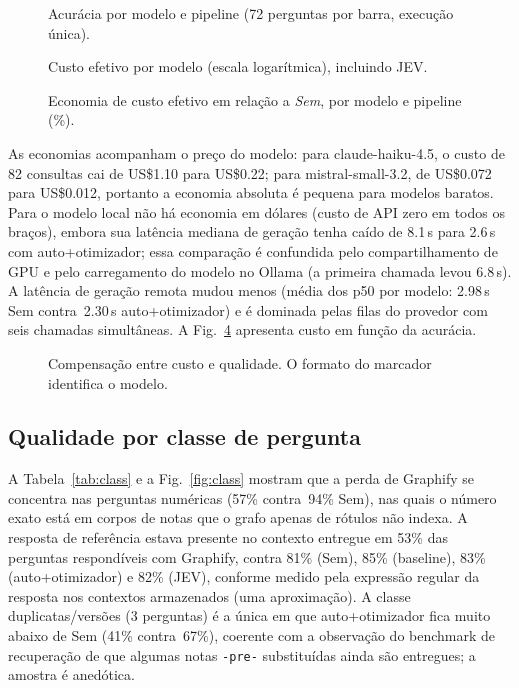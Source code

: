 \documentclass[conference,onecolumn,11pt]{IEEEtran}
\begin{document}
\begin{figure}[!htbp]\centering
{}
\caption{Acurácia por modelo e pipeline (72 perguntas por barra, execução única).}\label{fig:accmodel}
\end{figure}

\begin{figure}[!htbp]\centering
{}
\caption{Custo efetivo por modelo (escala logarítmica), incluindo JEV.}\label{fig:costmodel}
\end{figure}

\begin{figure}[!htbp]\centering
{}
\caption{Economia de custo efetivo em relação a \emph{Sem}, por modelo e pipeline (\%).}\label{fig:heat}
\end{figure}

As economias acompanham o preço do modelo: para claude-haiku-4.5, o custo de 82 consultas cai de US\$1.10 para US\$0.22; para mistral-small-3.2, de US\$0.072 para US\$0.012, portanto a economia absoluta é pequena para modelos baratos. Para o modelo local não há economia em dólares (custo de API zero em todos os braços), embora sua latência mediana de geração tenha caído de 8.1\,s para 2.6\,s com auto+otimizador; essa comparação é confundida pelo compartilhamento de GPU e pelo carregamento do modelo no Ollama (a primeira chamada levou 6.8\,s). A latência de geração remota mudou menos (média dos p50 por modelo: 2.98\,s Sem contra\ 2.30\,s auto+otimizador) e é dominada pelas filas do provedor com seis chamadas simultâneas. A Fig.~\ref{fig:pareto} apresenta custo em função da acurácia.

\begin{figure}[!htbp]\centering
{}
\caption{Compensação entre custo e qualidade. O formato do marcador identifica o modelo.}\label{fig:pareto}
\end{figure}

\subsection{Qualidade por classe de pergunta}
A Tabela~\ref{tab:class} e a Fig.~\ref{fig:class} mostram que a perda de Graphify se concentra nas perguntas numéricas (57\% contra\ 94\% Sem), nas quais o número exato está em corpos de notas que o grafo apenas de rótulos não indexa. A resposta de referência estava presente no contexto entregue em 53\% das perguntas respondíveis com Graphify, contra 81\% (Sem), 85\% (baseline), 83\% (auto+otimizador) e 82\% (JEV), conforme medido pela expressão regular da resposta nos contextos armazenados (uma aproximação). A classe duplicatas/versões (3 perguntas) é a única em que auto+otimizador fica muito abaixo de Sem (41\% contra\ 67\%), coerente com a observação do benchmark de recuperação de que algumas notas \texttt{-pre-} substituídas ainda são entregues; a amostra é anedótica.
\end{document}

